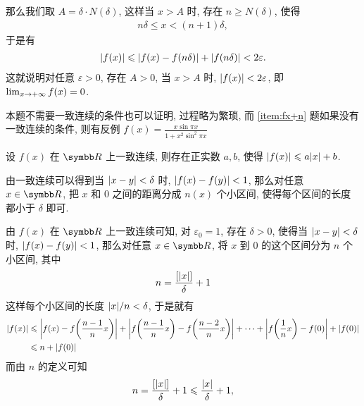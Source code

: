 \begin{exercise}[series=exer]
\begin{answer}
        那么我们取 $ A = \delta \cdot N(\delta) $, 这样当 $ x > A $ 时, 存在 $ n \ge N(\delta) $, 使得
        \begin{align*}
            n\delta \le x < (n + 1)\delta,
        \end{align*}
        于是有
        \begin{align*}
            \abs{f(x)} \leqslant \abs{f(x) - f(n\delta)} + \abs{f(n\delta)} < 2\varepsilon. 
        \end{align*}
        这就说明对任意 $ \varepsilon > 0 $, 存在 $ A > 0 $, 当 $ x > A $ 时, $ \abs{f(x)} < 2\varepsilon $, 即 $ \lim_{x \to +\infty} f(x) = 0 $. 
    \end{answer}
    \begin{remark}
        本题不需要一致连续的条件也可以证明, 过程略为繁琐, 而 \ref{item:fx+n} 题如果没有一致连续的条件, 则有反例 $ f(x) = \frac{x\sin \pi x}{1 + x^{2} \sin^{2} \pi x} $ 
    \end{remark}
    \item\label{item:一致连续可以被控制} 设 $ f(x) $ 在 $ \R $ 上一致连续, 则存在正实数 $ a, b $, 使得 $ \abs{f(x)} \leqslant a\abs{x} + b $. 
    \begin{hint}
        由一致连续可以得到当 $ \abs{x - y} < \delta $ 时, $ \abs{f(x) - f(y)} < 1 $, 那么对任意 $ x \in \R $, 把 $ x $ 和 $ 0 $ 之间的距离分成 $ n(x) $ 个小区间, 使得每个区间的长度都小于 $ \delta $ 即可.
    \end{hint}
    \begin{answer}
        由 $ f(x) $ 在 $ \R $ 上一致连续可知, 对 $ \varepsilon_{0} = 1 $, 存在 $ \delta > 0 $, 使得当 $ \abs{x - y} < \delta $ 时, $ \abs{f(x) - f(y)} < 1 $, 那么对任意 $ x \in \R $, 将 $ x $ 到 $ 0 $ 的这个区间分为 $ n $ 个小区间, 其中
        \begin{align*}
            n = \frac{[\abs{x}]}{\delta} + 1
        \end{align*}
        这样每个小区间的长度 $ \abs{x}/n < \delta $, 于是就有
        \begin{align*}
            \abs{f(x)} & \leqslant \abs{f(x) - f\qty(\frac{n - 1}{n}x)} + \abs{f\qty(\frac{n - 1}{n}x) - f\qty(\frac{n - 2}{n}x)} + \dots + \abs{f\qty(\frac{1}{n}x) - f(0)} + \abs{f(0)}\\
            & \leqslant n + \abs{f(0)}
        \end{align*}
        而由 $ n $ 的定义可知
        \begin{align*}
            n = \frac{[\abs{x}]}{\delta} + 1 \leqslant \frac{\abs{x}}{\delta} + 1,
        \end{align*}

\end{answer}
\end{exercise}
